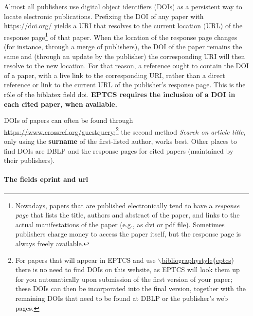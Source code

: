 \documentclass[submission,copyright,creativecommons]{eptcs}
\begin{document}
Almost all publishers use digital object identifiers (DOIs) as a
persistent way to locate electronic publications. Prefixing the DOI of
any paper with {\ttfamily https://doi.org/} yields a URI that resolves to the
current location (URL) of the response page\footnote{Nowadays, papers
  that are published electronically tend
  to have a \emph{response page} that lists the title, authors and
  abstract of the paper, and links to the actual manifestations of
  the paper (e.g., as {\ttfamily dvi} or {\ttfamily pdf} file). Sometimes
  publishers charge money to access the paper itself, but the response
  page is always freely available.}
of that paper. When the location of the response page changes (for
instance, through a merge of publishers), the DOI of the paper remains
the same and (through an update by the publisher) the corresponding
URI will then resolve to the new location. For that reason, a reference
ought to contain the DOI of a paper, with a live link to the corresponding
URI, rather than a direct reference or link to the current URL of the
publisher's response page. This is the r\^ole of the biblatex field {\ttfamily doi}.
{\bfseries EPTCS requires the inclusion of a DOI in each cited paper, when available.}

DOIs of papers can often be found through
\url{https://www.crossref.org/guestquery};\footnote{For papers that will appear
  in EPTCS and use \href{https://eptcs.web.cse.unsw.edu.au/eptcs.bst}
  {\ttfamily $\backslash$bibliographystyle$\{$eptcs$\}$} there is no need to
  find DOIs on this website, as EPTCS will look them up for you
  automatically upon submission of the first version of your paper;
  these DOIs can then be incorporated into the final version, together
  with the remaining DOIs that need to be found at DBLP or the publisher's web pages.}
the second method {\itshape Search on article title}, only using the {\bfseries
surname} of the first-listed author, works best.
Other places to find DOIs are DBLP and the response pages for cited
papers (maintained by their publishers).

\paragraph{The fields {\ttfamily eprint} and {\ttfamily url}}
\end{document}
